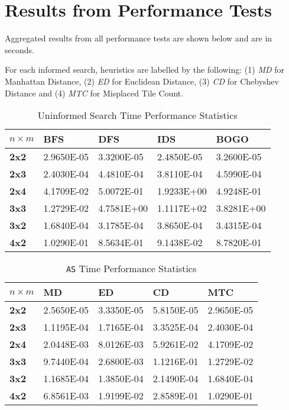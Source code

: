 \section{Results from Performance Tests}
\label{sec:Results from Performance Tests}

Aggregated results from all performance tests are shown below and are in seconds.

For each informed search, heuristics
are labelled by the following: (1) \emph{MD} for Manhattan Distance, (2)
\emph{ED} for Euclidean Distance, (3) \emph{CD} for Chebyshev Distance and
(4) \emph{MTC} for Misplaced Tile Count.

\newcommand\nm { $n \times m$ }

\begin{table}[h!]
\centering
\caption{Uninformed Search Time Performance Statistics}
\label{tab:uninformed}
\begin{tabular}{|l|l|l|l|l|}
\hline
\textbf{\nm} & \textbf{BFS} & \textbf{DFS} & \textbf{IDS} & \textbf{BOGO} \\ \hline \hline
\textbf{2x2} & 2.9650E-05   & 3.3200E-05   & 2.4850E-05   & 3.2600E-05    \\ \hline
\textbf{2x3} & 2.4030E-04   & 4.4810E-04   & 3.8110E-04   & 4.5990E-04    \\ \hline
\textbf{2x4} & 4.1709E-02   & 5.0072E-01   & 1.9233E+00   & 4.9248E-01    \\ \hline
\textbf{3x3} & 1.2729E-02   & 4.7581E+00   & 1.1117E+02   & 3.8281E+00    \\ \hline
\textbf{3x2} & 1.6840E-04   & 3.1785E-04   & 3.8650E-04   & 3.4315E-04    \\ \hline
\textbf{4x2} & 1.0290E-01   & 8.5634E-01   & 9.1438E-02   & 8.7820E-01    \\ \hline
\end{tabular}
\end{table}

\begin{table}[h!]
\centering
\caption{\texttt{AS} Time Performance Statistics}
\label{tab:as}
\begin{tabular}{|l|l|l|l|l|}
\hline
\textbf{\nm} & \textbf{MD} & \textbf{ED} & \textbf{CD} & \textbf{MTC} \\ \hline \hline
\textbf{2x2} & 2.5650E-05  & 3.3350E-05  & 5.8150E-05  & 2.9650E-05   \\ \hline
\textbf{2x3} & 1.1195E-04  & 1.7165E-04  & 3.3525E-04  & 2.4030E-04   \\ \hline
\textbf{2x4} & 2.0448E-03  & 8.0126E-03  & 5.9261E-02  & 4.1709E-02   \\ \hline
\textbf{3x3} & 9.7440E-04  & 2.6800E-03  & 1.1216E-01  & 1.2729E-02   \\ \hline
\textbf{3x2} & 1.1685E-04  & 1.3850E-04  & 2.1490E-04  & 1.6840E-04   \\ \hline
\textbf{4x2} & 6.8561E-03  & 1.9199E-02  & 2.8589E-01  & 1.0290E-01   \\ \hline
\end{tabular}
\end{table}

